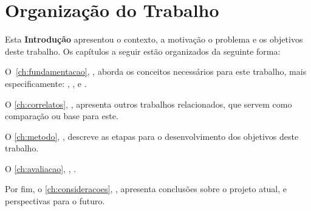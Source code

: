 

\section{Organização do Trabalho}\label{sec:organizacao}
Esta \textbf{Introdução} apresentou o contexto, a motivação o problema e os objetivos deste trabalho. Os capítulos a seguir estão organizados da seguinte forma:

O~\autoref{ch:fundamentacao}, \textbf{}, aborda os conceitos necessários para este trabalho, mais especificamente: , ,  e .

O \autoref{ch:correlatos}, \textbf{}, apresenta outros trabalhos relacionados, que servem como comparação ou base para este.

O \autoref{ch:metodo}, \textbf{}, descreve as etapas para o desenvolvimento dos objetivos deste trabalho.

O \autoref{ch:avaliacao}, \textbf{}, .

Por fim, o \autoref{ch:consideracoes}, \textbf{}, apresenta conclusões sobre o projeto atual, e perspectivas para o futuro.